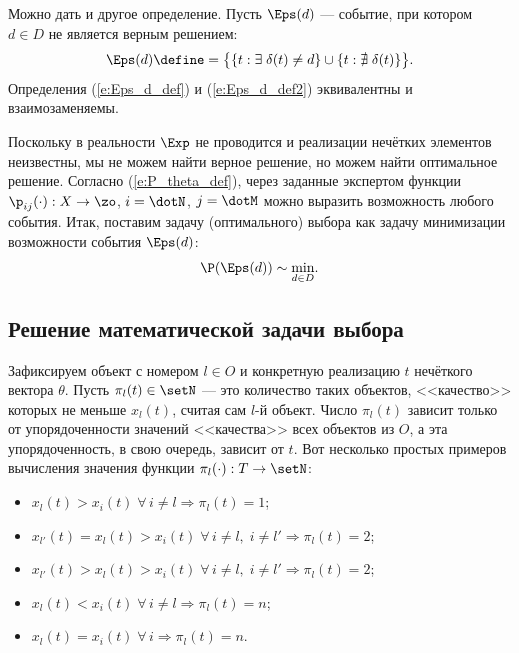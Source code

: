 Можно дать и другое определение. Пусть $\Eps(d)$ --- событие, при котором $d \in D$ не является верным решением:
\begin{equation}
  \label{e:Eps_d_def2}
  \Eps(d) \define= \big\{\{t: \exists\; \delta(t) \neq d\} \cup \{t: \nexists\; \delta(t)\}\big\}. 
\end{equation}
Определения (\ref{e:Eps_d_def}) и (\ref{e:Eps_d_def2}) эквивалентны и взаимозаменяемы.


Поскольку в реальности $\Exp$ не проводится и реализации нечётких элементов неизвестны, мы не можем найти верное решение, но можем найти оптимальное решение. Согласно (\ref{e:P_theta_def}), через заданные экспертом функции $\p_{ij}(\cdot): X \rightarrow \zo$, $i = \dotN$, $j = \dotM$ можно выразить возможность любого события.  Итак, поставим задачу (оптимального) выбора {} как задачу минимизации возможности события $\Eps(d)$:
\begin{equation}
  \label{e:zadacha}
  \P(\Eps(d)) \sim \underset{d \in D} \min.
\end{equation}

\subsection{Решение математической задачи выбора}

Зафиксируем объект с номером $l \in O$ и конкретную реализацию  $t$ нечёткого вектора $\theta$. Пусть $\pi_l(t) \in \setN$ --- это количество таких объектов, <<качество>> которых не меньше $x_l(t)$, считая сам $l$-й объект. Число $\pi_l(t)$ зависит только от упорядоченности значений <<качества>> всех объектов из $O$, а эта упорядоченность, в свою очередь, зависит от $t$. Вот несколько простых примеров вычисления значения функции $\pi_l(\cdot): T \rightarrow \setN$:
\begin{itemize}
  \item $x_l(t) > x_i(t) \;\forall\, i \neq l \Rightarrow \pi_l(t) = 1$;
  \item $x_{l'}(t) = x_l(t) > x_i(t) \;\forall\, i \neq l,\; i \neq l' \Rightarrow \pi_l(t) = 2$;
  \item $x_{l'}(t) > x_l(t) > x_i(t) \;\forall\, i \neq l,\; i \neq l' \Rightarrow \pi_l(t) = 2$;
  \item $x_l(t) < x_i(t) \;\forall\, i \neq l \Rightarrow \pi_l(t) = n$;
  \item $x_l(t) = x_i(t) \;\forall\, i \Rightarrow \pi_l(t) = n$.
\end{itemize}

